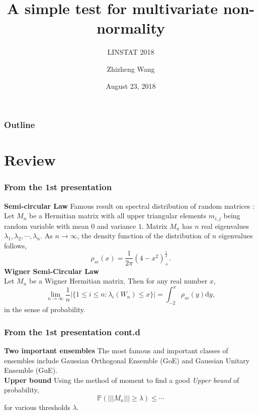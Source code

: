 \documentclass{beamer}
\title{A simple test for multivariate non-normality}
\subtitle{LINSTAT 2018}
\author{Zhizheng Wang}
\institute{Linnaeus University}
\date{August 23, 2018}
\begin{document}
\begin{frame}
\titlepage
\end{frame}

\begin{frame}
\frametitle{Outline}
\tableofcontents
\end{frame}

\section{Review}
\begin{frame}
\frametitle{From the 1st presentation}
\textbf{Semi-circular Law} 
Famous result on spectral distribution of random matrices \cite{wigner1958distribution}:\\
Let $M_n$ be a Hermitian matrix with all upper triangular elements $m_{i,j}$ being random variable with mean $0$ and variance $1$. Matrix $M_n$ has $n$ real eigenvalues $\lambda_1, \lambda_2, \cdots, \lambda_n$. As $n \rightarrow \infty$, the density function of the distribution of $n$ eigenvalues follows,
\[
\rho_{sc}(x) = \frac{1}{2\pi}(4-x^2)^{\frac{1}{2}}_{+}.
\]
\textbf{Wigner Semi-Circular Law}\\
Let $M_n$ be a Wigner Hermitian matrix. Then for any real number
$x$,
\[
\lim_{n \rightarrow \infty} \frac{1}{n} |\{ 1 \leq i \leq n: \lambda_i(W_n)\leq x \}| = \int_{-2}^x \rho_{sc}(y)\text{d}y,
\]
in the sense of probability. 
\end{frame}

\begin{frame}
\frametitle{From the 1st presentation cont.d}
\textbf{Two important ensembles}
The most famous and important classes of ensembles include Gaussian Orthogonal Ensemble (GoE) and Gaussian Unitary Ensemble (GuE).\\ 
\vspace{10mm} %
\textbf{Upper bound}
Using the method of moment to find a good \textit{Upper bound} of probability,
\[
\mathbb{P}(|||M_n|||\geq \lambda) \leq \cdots
\]
for various thresholds $\lambda$.
\end{frame}

\end{document}
